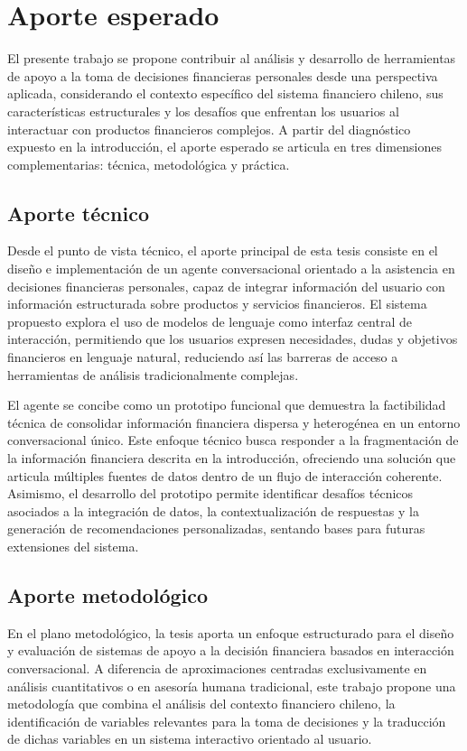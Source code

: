 \documentclass[
	spanish, %
	letterpaper, oneside
]{book}
\begin{document}
\section{Aporte esperado}

El presente trabajo se propone contribuir al análisis y desarrollo de herramientas de apoyo a la toma de decisiones financieras personales desde una perspectiva aplicada, considerando el contexto específico del sistema financiero chileno, sus características estructurales y los desafíos que enfrentan los usuarios al interactuar con productos financieros complejos. A partir del diagnóstico expuesto en la introducción, el aporte esperado se articula en tres dimensiones complementarias: técnica, metodológica y práctica.

\subsection{Aporte técnico}

Desde el punto de vista técnico, el aporte principal de esta tesis consiste en el diseño e implementación de un agente conversacional orientado a la asistencia en decisiones financieras personales, capaz de integrar información del usuario con información estructurada sobre productos y servicios financieros. El sistema propuesto explora el uso de modelos de lenguaje como interfaz central de interacción, permitiendo que los usuarios expresen necesidades, dudas y objetivos financieros en lenguaje natural, reduciendo así las barreras de acceso a herramientas de análisis tradicionalmente complejas.

El agente se concibe como un prototipo funcional que demuestra la factibilidad técnica de consolidar información financiera dispersa y heterogénea en un entorno conversacional único. Este enfoque técnico busca responder a la fragmentación de la información financiera descrita en la introducción, ofreciendo una solución que articula múltiples fuentes de datos dentro de un flujo de interacción coherente. Asimismo, el desarrollo del prototipo permite identificar desafíos técnicos asociados a la integración de datos, la contextualización de respuestas y la generación de recomendaciones personalizadas, sentando bases para futuras extensiones del sistema.

\subsection{Aporte metodológico}

En el plano metodológico, la tesis aporta un enfoque estructurado para el diseño y evaluación de sistemas de apoyo a la decisión financiera basados en interacción conversacional. A diferencia de aproximaciones centradas exclusivamente en análisis cuantitativos o en asesoría humana tradicional, este trabajo propone una metodología que combina el análisis del contexto financiero chileno, la identificación de variables relevantes para la toma de decisiones y la traducción de dichas variables en un sistema interactivo orientado al usuario.
\end{document}
